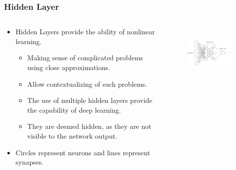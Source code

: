 \documentclass{beamer}
\begin{document}
   \begin{frame}
      \frametitle{Hidden Layer}
      \begin{columns}[T]
         \begin{column}[T]{5cm}
            \begin{itemize}
               \item Hidden Layers provide the ability of nonlinear learning.
               \begin{itemize}
                  \item Making sense of complicated problems using close approximations.
                  \item Allow contextualizing of such problems.
                  \item The use of multiple hidden layers provide the capability of deep learning.
                  \item They are deemed hidden, as they are not visible to the network output.
               \end{itemize}
               \item Circles represent neurons and lines represent synapses.
            \end{itemize}
         \end{column}
         \begin{column}[T]{5cm}
            \begin{figure}[htbp]
               \includegraphics[height=2.8cm]{mlp-network}
            \end{figure}
         \end{column}
      \end{columns}
   \end{frame}
\end{document}
